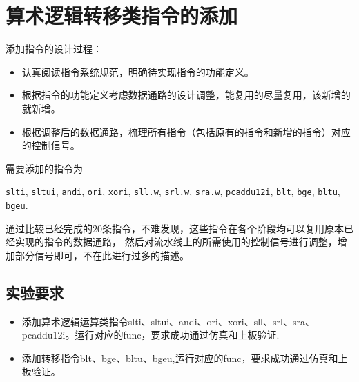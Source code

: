 \section{算术逻辑转移类指令的添加}


添加指令的设计过程：

\begin{itemize}
    \item 认真阅读指令系统规范，明确待实现指令的功能定义。
    \item 根据指令的功能定义考虑数据通路的设计调整，能复用的尽量复用，该新增的就新增。
    \item 根据调整后的数据通路，梳理所有指令（包括原有的指令和新增的指令）对应的控制信号。
\end{itemize}

需要添加的指令为

\texttt{slti},
\texttt{sltui},
\texttt{andi},
\texttt{ori},
\texttt{xori},
\texttt{sll.w},
\texttt{srl.w},
\texttt{sra.w},
\texttt{pcaddu12i},
\texttt{blt},
\texttt{bge},
\texttt{bltu},
\texttt{bgeu}.

通过比较已经完成的20条指令，不难发现，这些指令在各个阶段均可以复用原本已经实现的指令的数据通路，
然后对流水线上的所需使用的控制信号进行调整，增加部分信号即可，不在此进行过多的描述。

\subsection{实验要求}

\begin{itemize}
    \item 添加算术逻辑运算类指令slti、sltui、andi、ori、xori、sll、srl、sra、pcaddu12i。运行对应的func，要求成功通过仿真和上板验证.
    \item 添加转移指令blt、bge、bltu、bgeu,运行对应的func，要求成功通过仿真和上板验证。
\end{itemize}